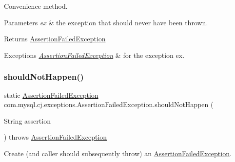 Convenience method.


\begin{DoxyParams}{Parameters}
{\em ex} & the exception that should never have been thrown. \\
\hline
\end{DoxyParams}
\begin{DoxyReturn}{Returns}
\mbox{\hyperlink{classcom_1_1mysql_1_1cj_1_1exceptions_1_1_assertion_failed_exception}{Assertion\+Failed\+Exception}} 
\end{DoxyReturn}

\begin{DoxyExceptions}{Exceptions}
{\em \mbox{\hyperlink{classcom_1_1mysql_1_1cj_1_1exceptions_1_1_assertion_failed_exception}{Assertion\+Failed\+Exception}}} & for the exception ex. \\
\hline
\end{DoxyExceptions}
\mbox{\label{classcom_1_1mysql_1_1cj_1_1exceptions_1_1_assertion_failed_exception_ab381eb045e20071a7ffed06a7d602f33}} 
\subsubsection{\texorpdfstring{should\+Not\+Happen()}{shouldNotHappen()}\hspace{0.1cm}{\footnotesize\ttfamily [2/2]}}
{\footnotesize\ttfamily static \mbox{\hyperlink{classcom_1_1mysql_1_1cj_1_1exceptions_1_1_assertion_failed_exception}{Assertion\+Failed\+Exception}} com.\+mysql.\+cj.\+exceptions.\+Assertion\+Failed\+Exception.\+should\+Not\+Happen (\begin{DoxyParamCaption}\item[{String}]{assertion }\end{DoxyParamCaption}) throws \mbox{\hyperlink{classcom_1_1mysql_1_1cj_1_1exceptions_1_1_assertion_failed_exception}{Assertion\+Failed\+Exception}}\hspace{0.3cm}{\ttfamily [static]}}

Create (and caller should subsequently throw) an {\ttfamily \mbox{\hyperlink{classcom_1_1mysql_1_1cj_1_1exceptions_1_1_assertion_failed_exception}{Assertion\+Failed\+Exception}}}.


